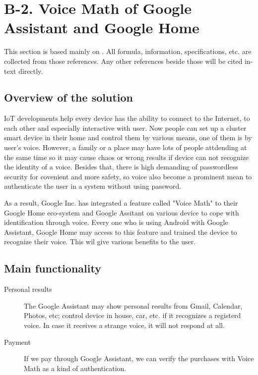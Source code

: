 \section*{B-2. Voice Math of Google Assistant and Google Home}

This section is based mainly on \cite{Google}. All formula, information, specifications, etc. are collected from those references. Any other references beside those will be cited in-text directly.

\subsection*{Overview of the solution}

IoT developments help every device has the ability to connect to the Internet, to each other and especially interactive with user. Now people can set up a cluster smart device in their home and control them by various means, one of them is by user's voice. However, a family or a place may have lots of people attdending at the same time so it may cause chaos or wrong results if device can not recognize the identity of a voice. Besides that, there is high demanding of passwordless security for covenient and more safety, so voice also become a prominent mean to authenticate the user in a system without using password.

As a result, Google Inc. has integrated a feature called "Voice Math" to their Google Home eco-system and Google Assitant on various device to cope with identification through voice. Every one who is using Android with Google Assistant, Google Home may access to this feature and trained the device to recognize their voice. This wil give various benefits to the user.

\subsection*{Main functionality} 

\begin{description}

	\item[Personal results] The Google Assistant may show personal results from Gmail, Calendar, Photos, etc; control device in house, car, etc. if it recognizes a registerd voice. In case it receives a strange voice, it will not respond at all.
	
	\item[Payment] If we pay through Google Assistant, we can verify the purchases with Voice Math as a kind of authentication.

\end{description}

